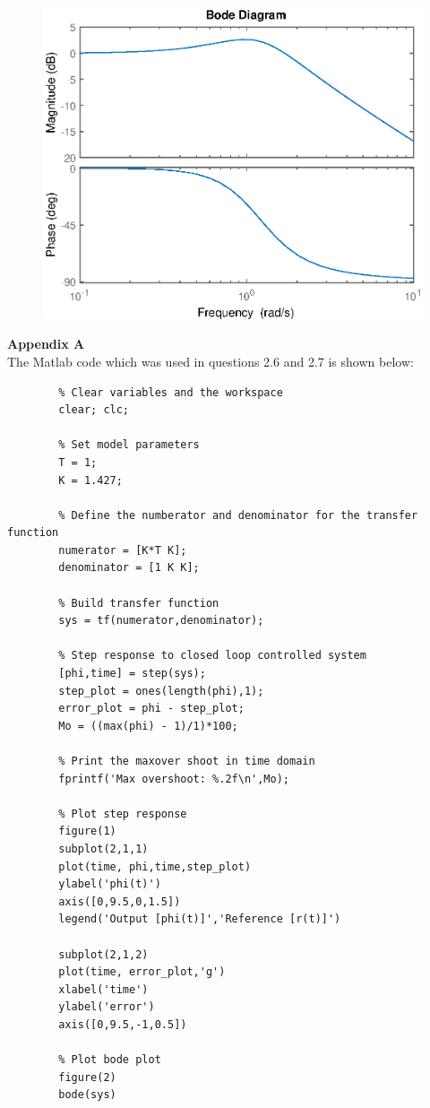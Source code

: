 \documentclass{article}
\begin{document}
	\begin{figure}[h]
		\centering
		\includegraphics[scale=0.8]{fig4.eps}
	\end{figure}
	
	\newpage
	
	\textbf{Appendix A}\\
	
	The Matlab code which was used in questions 2.6 and 2.7 is shown below:
	
	\begin{lstlisting}
		% Clear variables and the workspace
		clear; clc;
		
		% Set model parameters
		T = 1;
		K = 1.427;
		
		% Define the numberator and denominator for the transfer function
		numerator = [K*T K];
		denominator = [1 K K];
		
		% Build transfer function
		sys = tf(numerator,denominator);
		
		% Step response to closed loop controlled system
		[phi,time] = step(sys);
		step_plot = ones(length(phi),1);
		error_plot = phi - step_plot;
		Mo = ((max(phi) - 1)/1)*100;
		
		% Print the maxover shoot in time domain
		fprintf('Max overshoot: %.2f\n',Mo);
		
		% Plot step response
		figure(1)
		subplot(2,1,1)
		plot(time, phi,time,step_plot)
		ylabel('phi(t)')
		axis([0,9.5,0,1.5])
		legend('Output [phi(t)]','Reference [r(t)]')
		
		subplot(2,1,2)
		plot(time, error_plot,'g')
		xlabel('time')
		ylabel('error')
		axis([0,9.5,-1,0.5])
		
		% Plot bode plot
		figure(2)
		bode(sys)
	\end{lstlisting}
	
\end{document}
